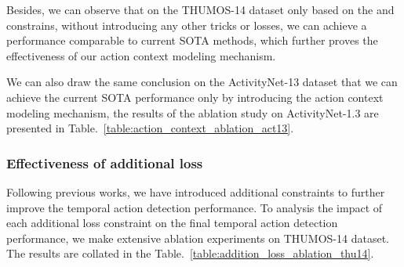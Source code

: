 \documentclass[journal,comsoc]{IEEEtran}
\begin{document}
\par Besides, we can observe that on the THUMOS-14 dataset only based on the  and  constrains, without introducing any other tricks or losses, we can achieve a performance comparable to current SOTA methods, which further proves the effectiveness of our action context modeling mechanism.
\par We can also draw the same conclusion on the ActivityNet-13 dataset that we can achieve the current SOTA performance only by introducing the action context modeling mechanism, the results of the ablation study on ActivityNet-1.3 are presented in Table.~\ref{table:action_context_ablation_act13}.

\subsubsection{Effectiveness of additional loss}
\begin{table}[t]
	\centering
	\caption{Evaluation the effectiveness of additional loss functions on the THUMOS-14 dataset. }
	\label{table:addition_loss_ablation_thu14}
\end{table}

\par Following previous works, we have introduced additional constraints  to further improve the temporal action detection performance. To analysis the impact of each additional loss constraint on the final temporal action detection performance, we make extensive ablation experiments on THUMOS-14 dataset. The results are collated in the Table.~\ref{table:addition_loss_ablation_thu14}.
\end{document}
